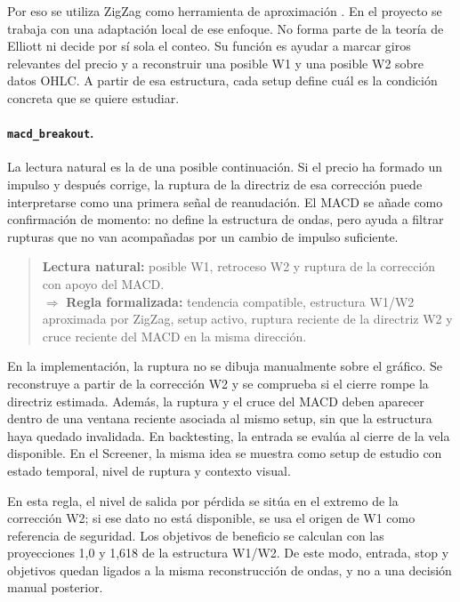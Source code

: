 Por eso se utiliza ZigZag como herramienta de aproximaci\'on
\cite{zigzag_jbn_github}. En el proyecto se trabaja con una adaptaci\'on local
de ese enfoque. No forma parte de la teor\'ia de Elliott ni decide por s\'i sola
el conteo. Su funci\'on es ayudar a marcar giros relevantes del precio y a reconstruir
una posible W1 y una posible W2 sobre datos OHLC. A partir de esa estructura,
cada setup define cu\'al es la condici\'on concreta que se quiere estudiar.

\paragraph{\texttt{macd\_breakout}.}
La lectura natural es la de una posible continuaci\'on. Si el precio ha formado
un impulso y despu\'es corrige, la ruptura de la directriz de esa correcci\'on
puede interpretarse como una primera se\~nal de reanudaci\'on. El MACD se a\~nade
como confirmaci\'on de momento: no define la estructura de ondas, pero ayuda a
filtrar rupturas que no van acompa\~nadas por un cambio de impulso suficiente.

\begin{quote}
\small
\textbf{Lectura natural:} posible W1, retroceso W2 y ruptura de la
correcci\'on con apoyo del MACD.\\
\(\Rightarrow\)
\textbf{Regla formalizada:} tendencia compatible, estructura W1/W2 aproximada
por ZigZag, setup activo, ruptura reciente de la directriz W2 y cruce reciente
del MACD en la misma direcci\'on.
\end{quote}

En la implementaci\'on, la ruptura no se dibuja manualmente sobre el gr\'afico.
Se reconstruye a partir de la correcci\'on W2 y se comprueba si el cierre rompe
la directriz estimada. Adem\'as, la ruptura y el cruce del MACD deben aparecer
dentro de una ventana reciente asociada al mismo setup, sin que la estructura
haya quedado invalidada. En backtesting, la entrada se eval\'ua al cierre de la
vela disponible. En el Screener, la misma idea se muestra como setup de estudio
con estado temporal, nivel de ruptura y contexto visual.

En esta regla, el nivel de salida por p\'erdida se sit\'ua en el extremo de la
correcci\'on W2; si ese dato no est\'a disponible, se usa el origen de W1 como
referencia de seguridad. Los objetivos de beneficio se calculan con las
proyecciones 1,0 y 1,618 de la estructura W1/W2. De este modo, entrada, stop y
objetivos quedan ligados a la misma reconstrucci\'on de ondas, y no a una
decisi\'on manual posterior.

